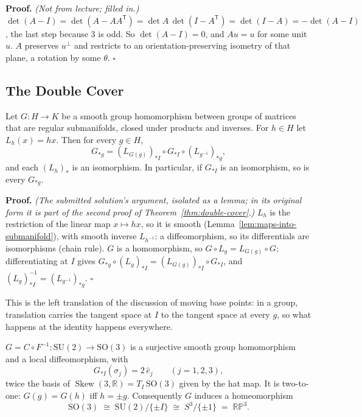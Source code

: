 \documentclass[11pt]{report}
\makeatletter
\newcounter{thmcounter}[section]
\renewenvironment{proof}[1][Proof]{\noindent\textbf{#1.} }{\hfill$\square$\par\vspace{5pt}}
\newcommand{\thmlabel}[1]{\edef\@currentlabel{\arabic{section}.\arabic{thmcounter}}\label{#1}}
\newcommand{\SO}{\mathrm{SO}}
\DeclareMathOperator{\Skew}{Skew}
\makeatother
\begin{document}
\begin{proof}
\textit{(Not from lecture; filled in.)} $\det(A - I) = \det(A - A A^{\mathsf T}) = \det A \, \det(I - A^{\mathsf T}) = \det(I - A) = -\det(A - I)$, the last step because $3$ is odd. So $\det(A - I) = 0$, and $Au = u$ for some unit $u$. $A$ preserves $u^\perp$ and restricts to an orientation-preserving isometry of that plane, a rotation by some $\theta$.
\end{proof}

\subsection{The Double Cover}\label{sub:double-cover}

\begin{lembox}\thmlabel{lem:group-morphism-translation}
Let $G : H \to K$ be a smooth group homomorphism between groups of matrices that are regular submanifolds, closed under products and inverses. For $h \in H$ let $L_h(x) = hx$. Then for every $g \in H$,
\[
G_{*g} = (L_{G(g)})_{*I} \circ G_{*I} \circ (L_{g^{-1}})_{*g} ,
\]
and each $(L_h)_{*}$ is an isomorphism. In particular, if $G_{*I}$ is an isomorphism, so is every $G_{*g}$.
\end{lembox}

\begin{proof}
\textit{(The submitted solution's argument, isolated as a lemma; in its original form it is part of the second proof of Theorem~\ref{thm:double-cover}.)} $L_h$ is the restriction of the linear map $x \mapsto hx$, so it is smooth (Lemma~\ref{lem:maps-into-submanifold}), with smooth inverse $L_{h^{-1}}$: a diffeomorphism, so its differentials are isomorphisms (chain rule). $G$ is a homomorphism, so $G \circ L_g = L_{G(g)} \circ G$; differentiating at $I$ gives $G_{*g} \circ (L_g)_{*I} = (L_{G(g)})_{*I} \circ G_{*I}$, and $(L_g)_{*I}^{-1} = (L_{g^{-1}})_{*g}$.
\end{proof}

This is the left translation of the discussion of moving base points: in a group, translation carries the tangent space at $I$ to the tangent space at every $g$, so what happens at the identity happens everywhere.

\begin{thmbox}[The Double Cover $\mathrm{SU}(2) \to \SO(3)$]\thmlabel{thm:double-cover}
$G = C \circ F^{-1} : \mathrm{SU}(2) \to \SO(3)$ is a surjective smooth group homomorphism and a local diffeomorphism, with
\[
G_{*I}(\sigma_j) = 2\,\hat e_j \qquad (j = 1, 2, 3),
\]
twice the basis of $\Skew(3, \mathbb{R}) = T_I\,\SO(3)$ given by the hat map. It is two-to-one: $G(g) = G(h)$ iff $h = \pm g$. Consequently $G$ induces a homeomorphism
\[
\SO(3) \;\cong\; \mathrm{SU}(2)/\{\pm I\} \;\cong\; S^3/\{\pm 1\} \;=\; \mathbb{RP}^3 .
\]
\end{thmbox}
\end{document}

